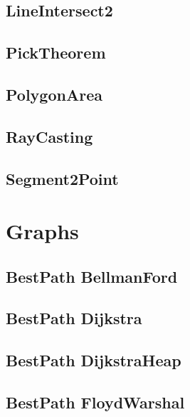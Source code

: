 \subsection{ LineIntersect2}
\raggedbottom
\hrulefill
\subsection{ PickTheorem}
\raggedbottom
\hrulefill
\subsection{ PolygonArea}
\raggedbottom
\hrulefill
\subsection{ RayCasting}
\raggedbottom
\hrulefill
\subsection{ Segment2Point}
\raggedbottom
\hrulefill

\section{Graphs}
\subsection{BestPath BellmanFord}
\raggedbottom
\hrulefill
\subsection{BestPath Dijkstra}
\raggedbottom
\hrulefill
\subsection{BestPath DijkstraHeap}
\raggedbottom
\hrulefill
\subsection{BestPath FloydWarshal}
\raggedbottom
\hrulefill
